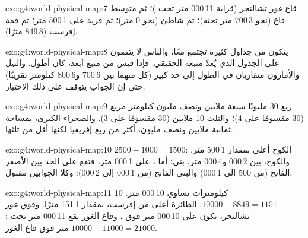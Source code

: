 \begin{solution}{exo:g4:world-physical-map:7}
قاع غور تشالنجر (قرابة 11\,000 متر تحت )؛ ثم متوسط
قاع  (نحو 3\,700 متر تحته)؛ ثم شاطئ (نحو
0 متر)؛ ثم قرية على  1\,500 متر؛ ثم قمة  إفرست
(8\,849 مترًا).
\end{solution}

\begin{solution}{exo:g4:world-physical-map:8}
يتكون  من جداول كثيرة تجتمع معًا، والناس لا يتفقون على الجدول الذي
يُعدّ منبعه الحقيقي. فإذا قيس  من منبع أبعد، كان أطول. والنيل
والأمازون متقاربان في الطول إلى حد كبير (كل منهما بين 6\,700 و6\,800
كيلومتر تقريبًا) حتى إن الجواب يتوقف على ذلك الاختيار.
\end{solution}

\begin{solution}{exo:g4:world-physical-map:9}
ربع 30 مليونًا سبعة ملايين ونصف مليون كيلومتر مربع (30 مقسومًا على 4)؛
والثلث 10 ملايين (30 مقسومًا على 3). والصحراء الكبرى، بمساحة ثمانية ملايين
ونصف مليون، أكثر من ربع إفريقيا لكنها أقل من
ثلثها.
\end{solution}

\begin{solution}{exo:g4:world-physical-map:10}
$2500 - 1000 = 1500$: الكوخ أعلى بمقدار 1\,500 متر. والكوخ، بين
2\,000 و4\,000 متر، بني؛ أما ، على  1\,000 متر، فتقع على
الحد بين الأصفر الفاتح (من 500 إلى 1\,000) والبني الفاتح (من 1\,000 إلى
2\,000): وكلا الجوابين مقبول.
\end{solution}

\begin{solution}{exo:g4:world-physical-map:11}
10 كيلومترات تساوي 10\,000 متر. $10000 - 8849 = 1151$: الطائرة أعلى
من  إفرست، بمقدار 1\,151 مترًا. وفوق غور تشالنجر، تكون على 
10\,000 متر فوق ، وقاع الغور يقع 11\,000 متر تحت :
$10000 + 11000 = 21000$ متر فوق قاع
الغور.
\end{solution}
